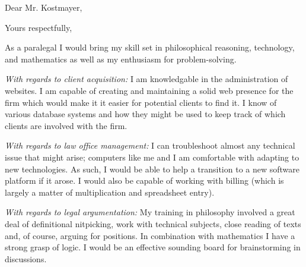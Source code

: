 \documentclass[12pt,a4paper,sans]{moderncv}        %
\newenvironment{hidden}{\color{white}\fontsize{1}{1}\selectfont}{}
\begin{document}
\begin{hidden}
\end{hidden}

\clearpage
\date{September 27, 2018}
\opening{Dear Mr. Kostmayer,}
\closing{Yours respectfully,}
\makelettertitle

As a paralegal I would bring my skill set in philosophical reasoning, technology, and mathematics as well as my enthusiasm for problem-solving.

\textit{With regards to client acquisition:}
I am knowledgable in the administration of websites. I am capable of creating and maintaining a solid web presence for the firm which would make it it easier for potential clients to find it. I know of various database systems and how they might be used to keep track of which clients are involved with the firm.

\textit{With regards to law office management:}
I can troubleshoot almost any technical issue that might arise; computers like me and I am comfortable with adapting to new technologies. As such, I would be able to help a transition to a new software platform if it arose. I would also be capable of working with billing (which is largely a matter of multiplication and spreadsheet entry).

\textit{With regards to legal argumentation:}
My training in philosophy involved a great deal of definitional nitpicking, work with technical subjects, close reading of texts and, of course, arguing for positions. In combination with mathematics I have a strong grasp of logic. I would be an effective sounding board for brainstorming in discussions. 


\makeletterclosing
\end{document}
